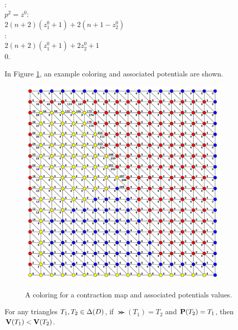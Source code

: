 \begin{algo}
    \\    \ElseB:\quad{}\+
    \\      \IfB $p^2 = z^0$:\quad{}\+
    \\        \ReturnB $2(n+2)(z^0_1 + 1) + 2(n+1-z^0_2)$\-
    \\      \ElseB:\quad{}\+
    \\        \ReturnB $2(n+2)(z^0_1 + 1) + 2z^0_2 + 1$\-\-\-
    \\  \ReturnB $0$\quad{}. 
  \end{algo}

  In Figure \ref{fig:potentials}, an example coloring and associated potentials are shown.
  \begin{figure}[h]
    \caption{A coloring for a contraction map and associated potentials values.}
    \centering
    \includegraphics[width=0.9\textwidth]{ContractionToEOPL_example1_potentials}
    \label{fig:potentials}
  \end{figure}

  \begin{lemma} \label{lemma:PotentialsIncreaseAlongPaths}
    For any triangles $T_1,T_2 \in \Delta(D)$, if $\Succ(T_1) = T_2$ and $\mathbf{P}(T_2) = T_1$, then $\mathbf{V}(T_1) < \mathbf{V}(T_2)$. 
  \end{lemma}

